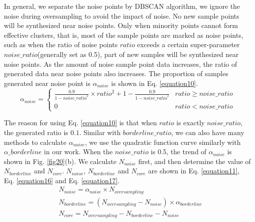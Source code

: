\documentclass[ida]{iosart2x}
\begin{document}
In general, 
we separate the noise points by DBSCAN algorithm,
we ignore the noise during oversampling to avoid the impact of noise.
No new sample points will be synthesized near noise points.
Only when minority points cannot form effective clusters, that is,
most of the sample points are marked as noise points, 
such as when the ratio of noise points $ratio$ exceeds a certain 
super-parameter $noise\_ratio$(generally set as 0.5),
part of new samples will be synthesized near noise points.
As the amount of noise sample point data increases, 
the ratio of generated data near noise points also increases. 
The proportion of samples generated near noise point
 is $\alpha_{noise}$ is shown in Eq. \ref{equation10}.
\begin{equation}
  \label{equation10}
  \alpha_{noise}=
  \begin{cases}
  \frac{0.9}{1-{noise\_{ratio}}^2}\times ratio^2+1-\frac{0.9}{1-{noise\_ratio}^2} & ratio \ge noise\_ratio\\
  0                                                                               & ratio < noise\_ratio
  \end{cases}
\end{equation}

The reason for using Eq. \ref{equation10} is that when $ratio$ is exactly
$noise\_ratio$, the generated ratio is $0.1$. Similar with $borderline\_ratio$,
we can also have many methods to calculate $\alpha_{noise}$,
we use the quadratic function curve similarly with $\alpha\_borderline$ in our work.
When the $noise\_ratio$ is 0.5, the trend of $\alpha_{noise}$ is shown in Fig. \ref{fig20}(b).
We calculate $N_{noise}$ first, and then determine the value of $N_{borderline}$ and $N_{core}$.
$N_{noise}$, $N_{borderline}$ 
and $N_{core}$ are shown in Eq. \ref{equation11}, Eq. \ref{equation16}
and Eq. \ref{equation17}.
\begin{align}
  \label{equation11} & N_{noise}=\alpha_{noise} \times N_{oversampling} \\
  \label{equation16} & N_{borderline}=(N_{oversampling}-N_{noise})\times \alpha_{borderline}\\
  \label{equation17} & N_{core}=N_{oversampling}-N_{borderline}-N_{noise}
\end{align}
\end{document}
